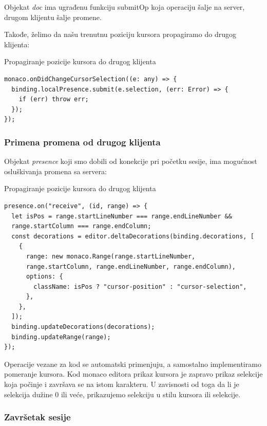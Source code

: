 \documentclass[12pt]{article}
\begin{document}
Objekat \textit{doc} ima ugrađenu funkciju submitOp koja operaciju šalje na server, drugom klijentu šalje promene.

Takođe, želimo da našu trenutnu poziciju kursora propagiramo do drugog klijenta:

\begin{mylisting}[label={lst:example}]{Propagiranje pozicije kursora do drugog klijenta}
\begin{lstlisting}
monaco.onDidChangeCursorSelection((e: any) => {
  binding.localPresence.submit(e.selection, (err: Error) => {
    if (err) throw err;
  });
});
\end{lstlisting}
\end{mylisting}

\subsubsection{Primena promena od drugog klijenta}

Objekat \textit{presence} koji smo dobili od konekcije pri početku sesije, ima mogućnost osluškivanja promena sa servera:

\begin{mylisting}[label={lst:example}]{Propagiranje pozicije kursora do drugog klijenta}
\begin{lstlisting}
presence.on("receive", (id, range) => {
  let isPos = range.startLineNumber === range.endLineNumber &&
  range.startColumn === range.endColumn;
  const decorations = editor.deltaDecorations(binding.decorations, [
    {
      range: new monaco.Range(range.startLineNumber, 
      range.startColumn, range.endLineNumber, range.endColumn),
      options: {
        className: isPos ? "cursor-position" : "cursor-selection",
      },
    },
  ]);
  binding.updateDecorations(decorations);
  binding.updateRange(range);
});
\end{lstlisting}
\end{mylisting}

Operacije vezane za kod se automatski primenjuju, a samostalno implementiramo pomeranje kursora. Kod monaco editora prikaz kursora je zapravo prikaz selekcije koja počinje i završava se na istom karakteru. U zavisnosti od toga da li je selekcija dužine 0 ili veće, prikazujemo selekciju u stilu kursora ili selekcije.

\subsubsection{Završetak sesije}
\end{document}
